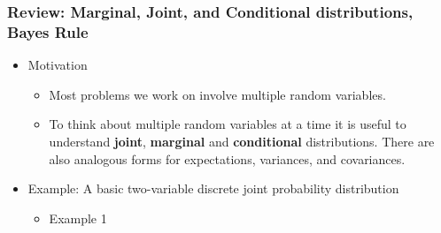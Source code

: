 \documentclass[12pt]{report}
\begin{document}
\subsubsection*{Review: Marginal, Joint, and Conditional distributions, Bayes Rule}
\label{sec-1-1-3}
\begin{itemize}
\item Motivation
\label{sec-1-1-3-1}
\begin{itemize}
\item Most problems we work on involve multiple random variables.
\item To think about multiple random variables at a time it is useful to understand \textbf{joint}, \textbf{marginal} and \textbf{conditional}
  distributions.  There are also analogous forms for expectations, variances, and covariances.
\end{itemize}
\item Example: A basic two-variable discrete joint probability distribution
\label{sec-1-1-3-2}
\begin{itemize}
\item Example 1
\label{sec-1-1-3-2-1}


\end{itemize}
\end{itemize}
\end{document}
